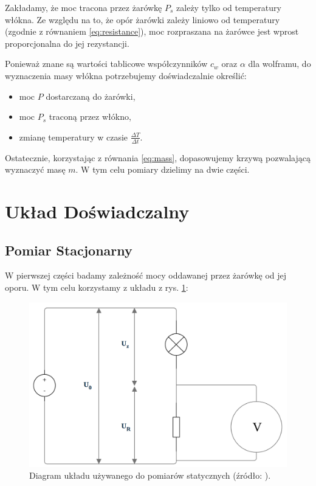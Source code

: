 \documentclass[12pt]{article}
\begin{document}
Zakładamy, że moc tracona przez żarówkę $P_s$ zależy tylko od temperatury włókna. Ze względu na to, że opór żarówki zależy liniowo od temperatury (zgodnie z równaniem \eqref{eq:resistance}), moc rozpraszana na żarówce jest wprost proporcjonalna do jej rezystancji.

Ponieważ znane są wartości tablicowe współczynników $c_w$ oraz $\alpha$ dla wolframu, do wyznaczenia masy włókna potrzebujemy doświadczalnie określić:  
\begin{itemize}
\item moc $P$ dostarczaną do żarówki,  
\item moc $P_s$ traconą przez włókno,  
\item zmianę temperatury w czasie $\frac{\Delta T}{\Delta t}$.  
\end{itemize}
Ostatecznie, korzystając z równania \eqref{eq:mass}, dopasowujemy krzywą pozwalającą wyznaczyć masę $m$. W tym celu pomiary dzielimy na dwie części.

\section{Układ Doświadczalny}
\subsection{Pomiar Stacjonarny}
W pierwszej części badamy zależność mocy oddawanej przez żarówkę od jej oporu. W tym celu korzystamy z układu z rys. \ref{fig:pomiar_stac}:
\begin{figure}[H]
    \centering
    \includegraphics[scale=0.25]{static}
    \caption{Diagram układu używanego do pomiarów statycznych (źródło: \cite{diagram}).}
    \label{fig:pomiar_stac}
\end{figure}
\end{document}
